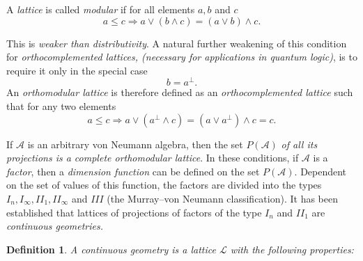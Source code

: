 \documentclass[aps,preprint]{revtex4}%
\newtheorem{definition}[theorem]{Definition}
\begin{document}
A \emph{lattice }is called \emph{modular} if for all elements $a,b$ and $c$
\begin{equation}
a\leq c\Rightarrow a\vee(b\wedge c)=(a\vee b)\wedge c.
\end{equation}


This is \emph{weaker than distributivity}. A natural further weakening of this
condition for \emph{orthocomplemented lattices, (necessary for applications in
quantum logic)}, is to require it only in the special case
\begin{equation}
b=a^{\bot}.
\end{equation}
An \emph{orthomodular lattice} is therefore defined as an
\emph{orthocomplemented lattice} such that for any two elements
\begin{equation}
a\leq c\Rightarrow a\vee(a^{\bot}\wedge c)=(a\vee a^{\bot})\wedge c=c.
\end{equation}


If $\mathcal{A}$ is an arbitrary von Neumann algebra, then the set
$P(\mathcal{A})$ \emph{of all its projections is a complete orthomodular
lattice}. In these conditions, if $\mathcal{A}$ is a \emph{factor}, then a
\emph{dimension function }can be defined on the set $P(\mathcal{A})$.
Dependent on the set of values of this function, the factors are divided into
the types $I_{n},I_{\infty},II_{1},II_{\infty}$ and $III$ (the Murray--von
Neumann classification). It has been established that lattices of projections
of factors of the type $I_{n}$ and $II_{1}$ are \emph{continuous geometries.}

\begin{definition}
A continuous geometry is a lattice $\mathcal{L}$ with the following properties:
\end{definition}
\end{document}
